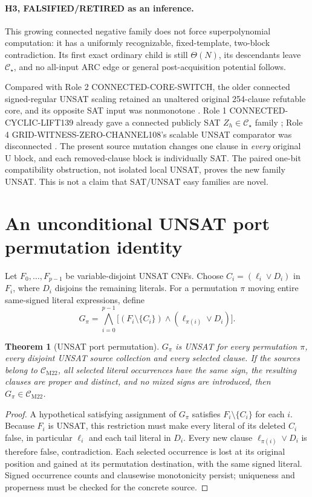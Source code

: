 \documentclass[11pt]{article}
\newtheorem{theorem}{Theorem}
\newcommand{\CM}{\mathcal C_{\mathrm{M22}}}
\newcommand{\CS}{\mathcal C_\star}
\begin{document}
\paragraph{H3, FALSIFIED/RETIRED as an inference.} This growing connected negative family does not force superpolynomial computation: it has a uniformly recognizable, fixed-template, two-block contradiction. Its first exact ordinary child is still \(\Theta(N)\), its descendants leave \(\CS\), and no all-input ARC edge or general post-acquisition potential follows.

Compared with Role 2 CONNECTED-CORE-SWITCH, the older connected signed-regular UNSAT scaling retained an unaltered original 254-clause refutable core, and its opposite SAT input was nonmonotone \cite{core}. Role 1 CONNECTED-CYCLIC-LIFT139 already gave a connected publicly SAT \(Z_h\in\CS\) family \cite{role1}; Role 4 GRID-WITNESS-ZERO-CHANNEL108's scalable UNSAT comparator was disconnected \cite{grid}. The present source mutation changes one clause in \emph{every} original U block, and each removed-clause block is individually SAT. The paired one-bit compatibility obstruction, not isolated local UNSAT, proves the new family UNSAT. This is not a claim that SAT/\(\mathrm{UNSAT}\) easy families are novel.

\section{An unconditional UNSAT port permutation identity}
Let \(F_0,\ldots,F_{p-1}\) be variable-disjoint UNSAT CNFs. Choose \(C_i=(\ell_i\lor D_i)\) in \(F_i\), where \(D_i\) disjoins the remaining literals. For a permutation \(\pi\) moving entire same-signed literal expressions, define
\[
G_\pi=\bigwedge_{i=0}^{p-1}\bigl[(F_i\setminus\{C_i\})\land(\ell_{\pi(i)}\lor D_i)\bigr].
\]
\begin{theorem}[UNSAT port permutation]
\(G_\pi\) is UNSAT for every permutation \(\pi\), every disjoint UNSAT source collection and every selected clause. If the sources belong to \(\CM\), all selected literal occurrences have the same sign, the resulting clauses are proper and distinct, and no mixed signs are introduced, then \(G_\pi\in\CM\).
\end{theorem}
\begin{proof}
A hypothetical satisfying assignment of \(G_\pi\) satisfies \(F_i\setminus\{C_i\}\) for each \(i\). Because \(F_i\) is UNSAT, this restriction must make every literal of its deleted \(C_i\) false, in particular \(\ell_i\) and each tail literal in \(D_i\). Every new clause \(\ell_{\pi(i)}\lor D_i\) is therefore false, contradiction. Each selected occurrence is lost at its original position and gained at its permutation destination, with the same signed literal. Signed occurrence counts and clausewise monotonicity persist; uniqueness and properness must be checked for the concrete source.
\end{proof}
\end{document}
